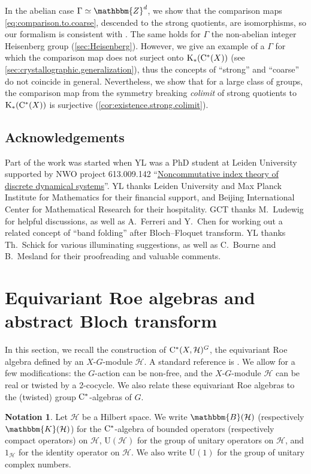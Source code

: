 \documentclass{amsart}
\numberwithin{figure}{section}
\numberwithin{equation}{section}
\numberwithin{table}{section}
\theoremstyle{plain}
\theoremstyle{definition}
\newtheorem*{notation}{Notation}
\theoremstyle{remark}
\theoremstyle{nonumber}
\newcommand{\Z}{\mathbb{Z}}
\newcommand{\Cpt}{\mathbb{K}}
\newcommand{\Bdd}{\mathbb{B}}
\newcommand{\K}{\relax\ifmmode\operatorname{K}\else\textup{K}\fi}
\newcommand{\Cst}{\relax\ifmmode\mathrm{C}^*\else\textup{C*}\fi}
\renewcommand{\mathbb}{\mathbbm} %
\begin{document}
In the abelian case
$\Gamma\simeq\Z^d$, we show that the comparison maps
\eqref{eq:comparison.to.coarse}, descended to the strong quotients, are isomorphisms, so our formalism is consistent
with \cite{Ewert-Meyer:Coarse_geometry}. The same holds for $\Gamma$ the
non-abelian integer Heisenberg group (\cref{sec:Heisenberg}).
However, we give an example of a $\Gamma$ for which the comparison map does
not surject onto $\K_*(\Cst(X))$  (see
\cref{sec:crystallographic.generalization}), thus the concepts of
``strong'' and ``coarse'' do not coincide in general. Nevertheless, we show
that for a large class of groups, the comparison map from the
symmetry breaking \emph{colimit} of strong quotients to $\K_*(\Cst(X))$ is
surjective (\cref{cor:existence.strong.colimit}).


\subsection*{Acknowledgements}
Part of the work was started when YL was a PhD student at Leiden University supported by 
NWO project 613.009.142
``\href{https://www.nwo.nl/projecten/613009142}{Noncommutative index theory
of discrete dynamical systems}''. YL thanks Leiden University and Max Planck Institute for Mathematics for their financial support, and Beijing International Center for Mathematical Research for their hospitality. GCT thanks M.~Ludewig for helpful discussions, as well as A.~Ferreri and Y.~Chen for working out a related concept of ``band folding'' after Bloch--Floquet transform. YL thanks Th.~Schick for various illuminating suggestions, as well as C.~Bourne and B.~Mesland for their
proofreading and valuable comments.

\section{Equivariant Roe algebras and abstract Bloch transform}
\label{sec:equiv_Roe_alg_transform}

In this section, we recall the construction of \( \Cst(X,\mathcal{H})^G \), 
the equivariant Roe algebra defined by an \( X \)-\( G \)-module \(
\mathcal{H} \).  A standard reference is
\cite{Willett-Yu:Higher_index_theory}. We allow for a few modifications:
the $G$-action can be non-free, and the \( X \)-\( G \)-module \(
\mathcal{H} \) can be real or twisted by a 2-cocycle.  We also relate
these equivariant Roe algebras to the (twisted) group $\Cst$-algebras of
$G$.

\begin{notation}
Let \(\mathcal{H}\) be a Hilbert space.
We write $\Bdd(\mathcal{H})$
(respectively $\Cpt(\mathcal{H})$) for the $\Cst$-algebra of bounded
operators (respectively compact operators) on
$\mathcal{H}$, \(\mathrm{U}(\mathcal{H})\) for the group of unitary operators on \(\mathcal{H}\), 
and $1_\mathcal{H}$ for the identity operator on $\mathcal{H}$. 
We also write \(\mathrm{U}(1)\) for the group of unitary complex numbers.
\end{notation}
\end{document}
